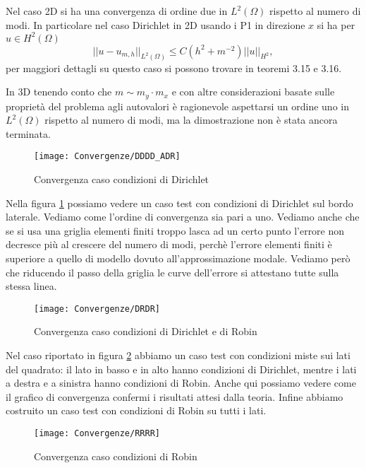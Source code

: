 Nel caso 2D si ha una convergenza di ordine due in $L^2(\Omega)$ rispetto al numero di modi.
In particolare nel caso Dirichlet in 2D usando i P1 in direzione $x$ si ha per $u\in H^2(\Omega)$
\begin{equation}
 \label{eq:stimainl2}
 ||u-u_{m,h}||_{L^2(\Omega)}\leq C ( h^2+m^{-2}) ||u||_{H^2},
\end{equation}
per maggiori dettagli su questo caso si possono trovare in \cite{zilio:himod} teoremi 3.15 e 3.16.

In 3D tenendo conto che $m\sim m_y\cdot m_x$ e con altre considerazioni basate sulle propriet\`a del problema agli autovalori
\`e ragionevole aspettarsi un ordine uno in $L^2(\Omega)$ rispetto al numero di modi, ma la dimostrazione 
non \`e stata ancora terminata.

\begin{figure}[!h]
\centering
\texttt{[image: Convergenze/DDDD\_ADR]}
\caption{Convergenza caso condizioni di Dirichlet}
\label{fig:ddddconv}
\end{figure}

Nella figura \ref{fig:ddddconv} possiamo vedere un caso test con condizioni di Dirichlet sul bordo laterale. Vediamo 
come l'ordine di convergenza sia pari a uno. Vediamo anche che se si usa una griglia elementi finiti troppo 
lasca ad un certo punto l'errore non decresce pi\`u al crescere del numero di modi, perch\`e 
l'errore elementi finiti \`e superiore a quello di modello dovuto all'approssimazione modale.
Vediamo per\`o che riducendo il passo della griglia le curve dell'errore si attestano tutte sulla stessa linea.

\begin{figure}[!h]
\centering
\texttt{[image: Convergenze/DRDR]}
\caption{Convergenza caso condizioni di Dirichlet e di Robin}
\label{fig:drdrconv}
\end{figure}

Nel caso riportato in figura \ref{fig:drdrconv} abbiamo un caso test con condizioni miste sui lati del quadrato:
il lato in basso e in alto hanno condizioni di Dirichlet, mentre i lati a destra e a sinistra hanno condizioni di Robin.
Anche qui possiamo vedere come il grafico di convergenza confermi i risultati attesi dalla teoria.
Infine abbiamo costruito un caso test con condizioni di Robin su tutti i lati. 

\begin{figure}[!h]
\centering
\texttt{[image: Convergenze/RRRR]}
\caption{Convergenza caso condizioni di Robin}
\label{fig:rrrr_conv}
\end{figure}

